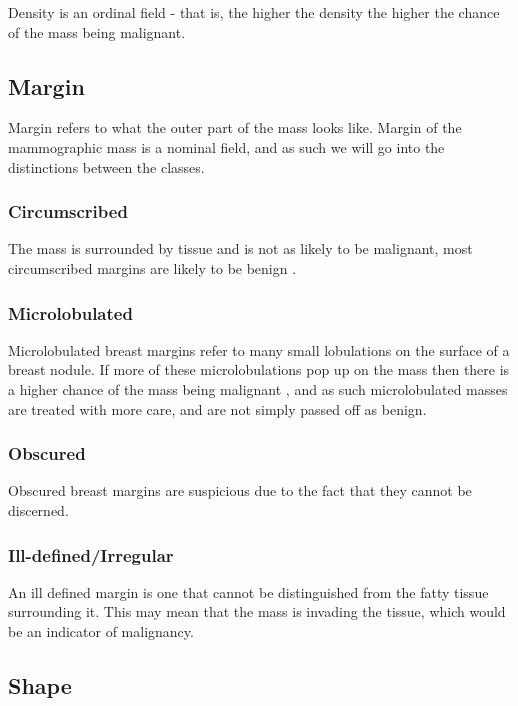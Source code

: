 \documentclass[12pt]{article}
\begin{document}
Density is an ordinal field - that is, the higher the density the higher the chance of the mass being malignant.

\subsection{Margin}

Margin refers to what the outer part of the mass looks like. Margin of the mammographic mass is a nominal field, and as such we will go into the distinctions between the classes. 

\subsubsection{Circumscribed}

The mass is surrounded by tissue and is not as likely to be malignant, most circumscribed margins are likely to be benign \cite{shapeMarginDensity, birads}.

\subsubsection{Microlobulated}

Microlobulated breast margins refer to many small lobulations on the surface of a breast nodule. If more of these microlobulations pop up on the mass then there is a higher chance of the mass being malignant \cite{benignOrMalignant}, and as such microlobulated masses are treated with more care, and are not simply passed off as benign.

\subsubsection{Obscured}

Obscured breast margins are suspicious due to the fact that they cannot be discerned.

\subsubsection{Ill-defined/Irregular}
An ill defined margin is one that cannot be distinguished from the fatty tissue surrounding it. This may mean that the mass is invading the tissue, which would be an indicator of malignancy.

\subsection{Shape}
\end{document}
